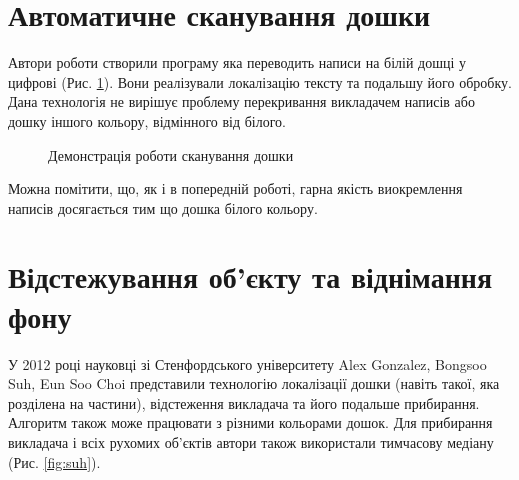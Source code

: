 \section{Автоматичне сканування дошки}
Автори роботи \cite{wienecke} створили програму яка переводить написи на білій
дошці у цифрові (Рис. \ref{fig:wienecke}). Вони реалізували локалізацію тексту та подальшу
його обробку. Дана технологія не вирішує проблему перекривання викладачем написів
або дошку іншого кольору, відмінного від білого.
\begin{figure}[H]
  \centering
  \caption{Демонстрація роботи сканування дошки \cite{wienecke}
    \label{fig:wienecke}
  }
\end{figure}
Можна помітити, що, як і в попередній роботі, гарна якість виокремлення написів
досягається тим що дошка білого кольору.

\section{Відстежування об'єкту та віднімання фону}
У 2012 році науковці зі Стенфордського університету Alex Gonzalez,
Bongsoo Suh, Eun Soo Choi представили технологію \cite{suh} локалізації дошки
(навіть такої, яка розділена на частини), відстеження викладача та його
подальше прибирання. Алгоритм також може працювати з різними кольорами
дошок. Для прибирання викладача і всіх рухомих об'єктів автори також
використали тимчасову медіану (Рис. \ref{fig:suh}).

